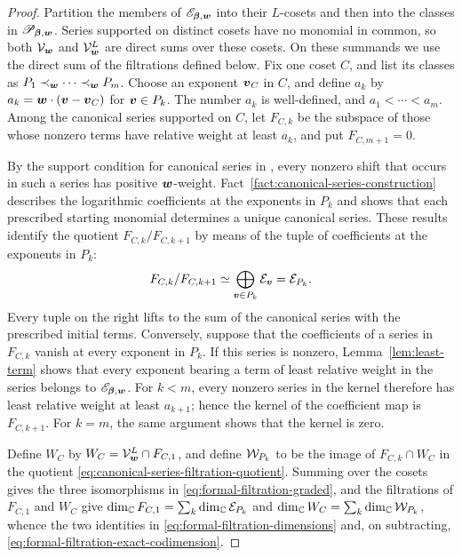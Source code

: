 \begin{proof}
	Partition the members of \(\mathscr E_{\boldsymbol{\beta},\boldsymbol{w}}\) into their \(L\)-cosets and then into the classes in \(\mathscr P_{\boldsymbol{\beta},\boldsymbol{w}}\).
	Series supported on distinct cosets have no monomial in common, so both \(\mathcal V_{\boldsymbol{w}}\) and \(\mathcal V_{\boldsymbol{w}}^{L}\) are direct sums over these cosets.
	On these summands we use the direct sum of the filtrations defined below.
	Fix one coset \(C\), and list its classes as \(P_1\prec_{\boldsymbol{w}}\cdots\prec_{\boldsymbol{w}}P_m\).
	Choose an exponent \(\boldsymbol{v}_C\) in \(C\), and define \(a_k\) by \(a_k=\boldsymbol{w}\cdot(\boldsymbol{v}-\boldsymbol{v}_C)\) for \(\boldsymbol{v}\in P_k\).
	The number \(a_k\) is well-defined, and \(a_1<\cdots<a_m\).
	Among the canonical series supported on \(C\), let \(F_{C,k}\) be the subspace of those whose nonzero terms have relative weight at least \(a_k\), and put \(F_{C,m+1}=0\).

	By the support condition for canonical series in \cite[Section~2.5]{SST00}, every nonzero shift that occurs in such a series has positive \(\boldsymbol{w}\)-weight.
	Fact~\ref{fact:canonical-series-construction} describes the logarithmic coefficients at the exponents in \(P_k\) and shows that each prescribed starting monomial determines a unique canonical series.
	These results identify the quotient \(F_{C,k}/F_{C,k+1}\) by means of the tuple of coefficients at the exponents in \(P_k\):
	\begin{equation}
		F_{C,k}/F_{C,k+1}
		\simeq
		\bigoplus_{\boldsymbol{v}\in P_k}\mathcal E_{\boldsymbol{v}}
		=
		\mathcal E_{P_k}.
		\label{eq:canonical-series-filtration-quotient}
	\end{equation}
	Every tuple on the right lifts to the sum of the canonical series with the prescribed initial terms.
	Conversely, suppose that the coefficients of a series in \(F_{C,k}\) vanish at every exponent in \(P_k\).
	If this series is nonzero, Lemma~\ref{lem:least-term} shows that every exponent bearing a term of least relative weight in the series belongs to \(\mathscr E_{\boldsymbol{\beta},\boldsymbol{w}}\).
	For \(k<m\), every nonzero series in the kernel therefore has least relative weight at least \(a_{k+1}\); hence the kernel of the coefficient map is \(F_{C,k+1}\).
	For \(k=m\), the same argument shows that the kernel is zero.

	Define \(W_C\) by \(W_C=\mathcal V_{\boldsymbol{w}}^{L}\cap F_{C,1}\), and define \(\mathcal W_{P_k}\) to be the image of \(F_{C,k}\cap W_C\) in the quotient \eqref{eq:canonical-series-filtration-quotient}.
	Summing over the cosets gives the three isomorphisms in \eqref{eq:formal-filtration-graded}, and the filtrations of \(F_{C,1}\) and \(W_C\) give \(\dim_{\mathbb C}F_{C,1} = \sum_k\dim_{\mathbb C}\mathcal E_{P_k}\) and \(\dim_{\mathbb C}W_C = \sum_k\dim_{\mathbb C}\mathcal W_{P_k}\), whence the two identities in \eqref{eq:formal-filtration-dimensions} and, on subtracting, \eqref{eq:formal-filtration-exact-codimension}.


\end{proof}
